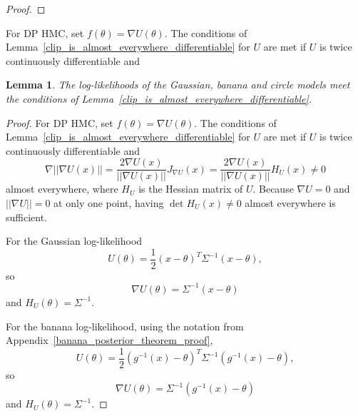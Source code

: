 \documentclass[english,twoside,openright]{HYgraduMLDS}
\newtheorem{lemma}{Lemma}
\newcommand{\R}{\mathbb{R}}
\begin{document}
\begin{appendices}
\begin{proof}

\end{proof}

For DP HMC, set \(f(\theta) = \nabla U(\theta)\). The conditions of
Lemma~\ref{clip_is_almost_everywhere_differentiable} for \(U\) are met if
\(U\) is twice continuously differentiable and
\begin{lemma}\label{model_clip_ok_lemma}
  The log-likelihoods of the Gaussian, banana and circle models meet the
  conditions of Lemma~\ref{clip_is_almost_everywhere_differentiable}.
\end{lemma}
\begin{proof}
For DP HMC, set \(f(\theta) = \nabla U(\theta)\). The conditions of
Lemma~\ref{clip_is_almost_everywhere_differentiable} for \(U\) are met if
\(U\) is twice continuously differentiable and
\[
  \nabla ||\nabla U(x)||
  = \frac{2\nabla U(x)}{||\nabla U(x)||}J_{\nabla U}(x)
  = \frac{2\nabla U(x)}{||\nabla U(x)||}H_{U}(x) \neq 0
\]
almost everywhere,
where \(H_{U}\) is the Hessian matrix of \(U\). Because \(\nabla U = 0\) and
\(||\nabla U|| = 0\) at only one point, having \(\det H_{U}(x) \neq 0\)
almost everywhere is sufficient.

For the Gaussian log-likelihood
\[
  U(\theta) = \frac{1}{2}(x - \theta)^{T}\Sigma^{-1}(x - \theta),
\]
so
\[
  \nabla U(\theta) = \Sigma^{-1}(x - \theta)
\]
and \(H_{U}(\theta) = \Sigma^{-1}\).

For the banana log-likelihood, using the notation from
Appendix~\ref{banana_posterior_theorem_proof},
\[
  U(\theta) = \frac{1}{2}(g^{-1}(x) - \theta)^{T}\Sigma^{-1}(g^{-1}(x) - \theta),
\]
so
\[
  \nabla U(\theta) = \Sigma^{-1}(g^{-1}(x) - \theta)
\]
and \(H_{U}(\theta) = \Sigma^{-1}\).


\end{proof}
\end{appendices}
\end{document}
